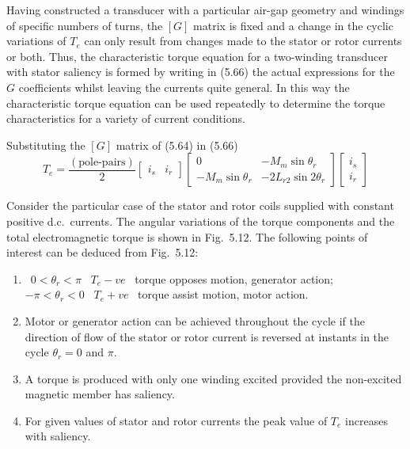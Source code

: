 \documentclass[a4paper,numbers=noenddot,12pt]{scrbook}
\begin{document}
    Having constructed a transducer with a particular air-gap geometry and windings of specific numbers of turns, the $[G]$ matrix is fixed and a change in the cyclic variations of $T_e$ can only result from changes made to the stator or rotor currents or both. Thus, the characteristic torque equation for a two-winding transducer with stator saliency is formed by writing in (5.66) the actual expressions for the $G$ coefficients whilst leaving the currents quite general. In this way the characteristic torque equation can be used repeatedly to determine the torque characteristics for a variety of current conditions.

    Substituting the $[G]$ matrix of (5.64) in (5.66)
    \begin{equation}
        T_e = \frac{(\text{pole-pairs})}{2}
        \begin{bmatrix}
            i_s & i_r
        \end{bmatrix}
        \begin{bmatrix}
            0 & -M_m\sin\theta_r \\ 
            - M_m \sin \theta_r & -2 L_{r2} \sin 2 \theta_r
        \end{bmatrix}
        \begin{bmatrix}
            i_s \\ i_r
        \end{bmatrix}
    \end{equation}

    Consider the particular case of the stator and rotor coils supplied with constant positive d.c.\ currents. The angular variations of the torque components and the total electromagnetic torque is shown in Fig.\ 5.12.
    \TabPositions{2.5cm,4cm}
    The following points of interest can be deduced from Fig.\ 5.12:
    \begin{enumerate}
        \item\ $ 0 < \theta_r < \pi $ \tab\ $T_e - v e$ \tab\ torque opposes motion, generator action;\\
            $-\pi < \theta_r < 0 $ \tab\ $T_e + v e$ \tab\ torque assist motion, motor action.

        \item Motor or generator action can be achieved throughout the cycle if the direction of flow of the stator or rotor current is reversed at instants in the cycle $\theta_r = 0$ and $\pi$.

        \item A torque is produced with only one winding excited provided the non-excited magnetic member has saliency.

        \item For given values of stator and rotor currents the peak value of $T_e$ increases with saliency.
    \end{enumerate}
\end{document}
